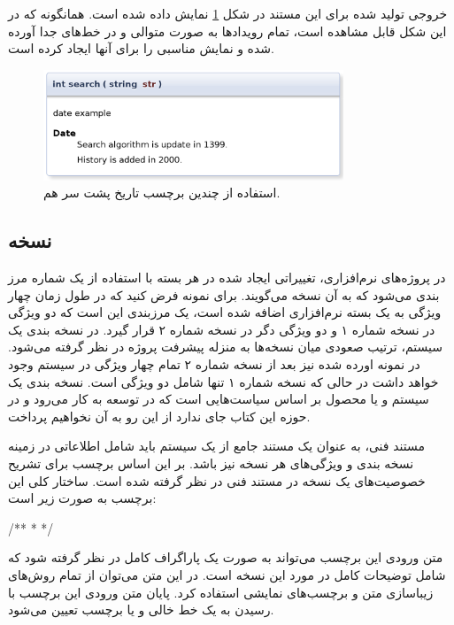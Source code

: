 خروجی تولید شده برای این مستند در شکل
\ref{write/document-the-code/developer-info/date-multi} نمایش داده شده است.
همانگونه که در این شکل قابل مشاهده است، تمام رویدادها به صورت متوالی و در خط‌های
جدا آورده شده و نمایش مناسبی را برای آنها ایجاد کرده است.
\begin{figure}
	\centering
	\includegraphics[width=0.8\textwidth]{image/write/document-the-code/developer-info/date-multi}
	\caption[چند برچسب تاریخ]{
		استفاده از چندین برچسب تاریخ پشت سر هم.
	}
	\label{write/document-the-code/developer-info/date-multi}
\end{figure}


\subsection{نسخه}

در پروژه‌های نرم‌افزاری، تغییراتی ایجاد شده در هر بسته با استفاده از یک شماره
مرز بندی می‌شود که به آن نسخه می‌گویند.
برای نمونه فرض کنید که در طول زمان چهار ویژگی به یک بسته نرم‌افزاری اضافه شده
است، یک مرزبندی این است که دو ویژگی در نسخه شماره ۱ و دو ویژگی دگر در نسخه شماره
۲ قرار گیرد.
در نسخه بندی یک سیستم، ترتیب صعودی میان نسخه‌ها به منزله پیشرفت پروژه در نظر
گرفته می‌شود.
در نمونه اورده شده نیز بعد از نسخه شماره ۲ تمام چهار ویژگی در سیستم وجود خواهد
داشت در حالی که نسخه شماره ۱ تنها شامل دو ویژگی است.
نسخه بندی یک سیستم و یا محصول بر اساس سیاست‌هایی است که در توسعه به کار می‌رود و
در حوزه این کتاب جای ندارد از این رو به آن نخواهیم پرداخت.

مستند فنی، به عنوان یک مستند جامع از یک سیستم باید شامل اطلاعاتی در زمینه نسخه
بندی و ویژگی‌های هر نسخه نیز باشد.
بر این اساس برچسب  برای تشریح خصوصیت‌های یک نسخه در مستند فنی در نظر
گرفته شده است.
ساختار کلی این برچسب به صورت زیر است:
\begin{C++}
/**
 * 
 */
\end{C++}

متن ورودی این برچسب می‌تواند به صورت یک پاراگراف کامل در نظر گرفته شود که شامل
توضیحات کامل در مورد این نسخه است.
در این متن می‌توان از تمام روش‌های زیباسازی متن و برچسب‌های نمایشی استفاده کرد.
پایان متن ورودی این برچسب با رسیدن به یک خط خالی و یا برچسب تعیین می‌شود.

